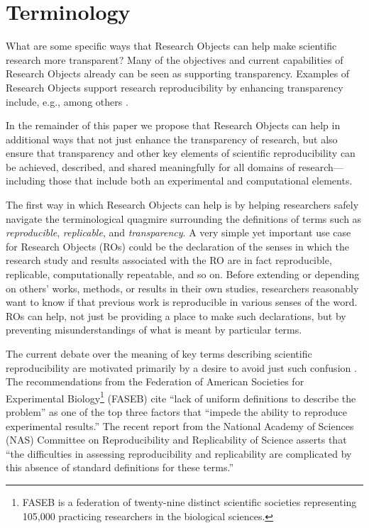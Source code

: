 \section{Terminology}\label{sec-terminology}

What are some specific ways that Research Objects \cite{bechhofer2013whya} can help 
	make scientific research more transparent?  
Many of the objectives and current capabilities of Research Objects already can be seen as supporting
	transparency.
Examples of Research Objects support research reproducibility by enhancing transparency include, e.g., 
	\cite{mecum2018preservingc} among others \cite{DBLP:conf/eScience/2018}. 


In the remainder of this paper we propose that Research Objects can help in additional ways that not
	just enhance the transparency of research, but also ensure that transparency and other key elements
	of scientific reproducibility can be achieved, described, and shared meaningfully for all domains
	of research---including those that include both an experimental and computational elements.

The first way in which Research Objects can help is by helping researchers safely navigate the 
	terminological quagmire surrounding the definitions of terms such as \emph{reproducible},
	\emph{replicable}, and \emph{transparency}.
A very simple yet important use case for Research Objects (ROs) could be the declaration of the senses in
	which the research study and results associated with the RO are in fact reproducible, replicable,
	computationally repeatable, and so on.
Before extending or depending on others' works, methods, or results in their own studies, researchers
	reasonably want to know if that previous work is reproducible in various senses of the word.
ROs can help, not just be providing a place to make such declarations, but by preventing
	misunderstandings of what is meant by particular terms.

The current debate over the meaning of key terms describing 
	scientific reproducibility are motivated primarily by a desire to avoid just such confusion \cite{drummond2009replicability,goodman2016what,rauber16primad,herouxtoward,plesser2018reproducibility,barba2018terminologies,committeeonreproducibilityandreplicabilityinscience2019reproducibility}.
The recommendations from the Federation of
	American Societies for Experimental Biology\footnote{FASEB is a federation of twenty-nine distinct scientific societies representing 105,000 
	practicing researchers in the biological sciences.} 
	(FASEB) 
	\cite{FASEB2016enhancing} cite ``lack of uniform definitions to describe the problem''
	as one of the top three factors that ``impede the ability to reproduce experimental results.''
 The recent report from the National Academy of Sciences (NAS) Committee on Reproducibility and Replicability of Science \cite{committeeonreproducibilityandreplicabilityinscience2019reproducibility} asserts
	that ``the difficulties in assessing reproducibility and replicability are complicated by this absence of
	standard definitions for these terms.''

